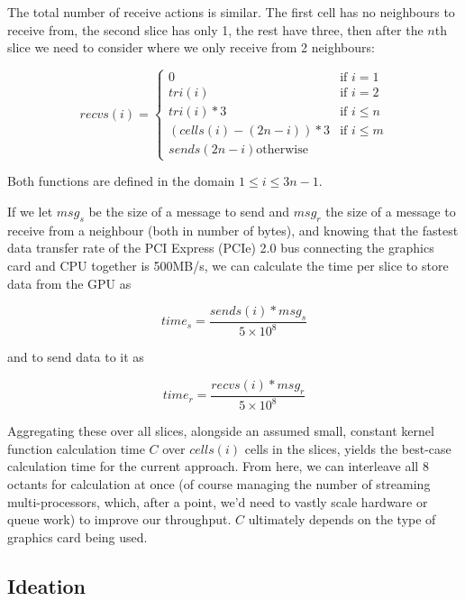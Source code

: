 \documentclass[conference]{IEEEtran}
\begin{document}
The total number of receive actions is similar. The first cell has no neighbours to receive from, the second slice has only 1, the rest have three, then after the $n$th slice we need to consider where we only receive from 2 neighbours:

\begin{equation}
recvs(i) = \left\{
	\begin{array}{ll}
		0 & \mbox{if } i = 1 \\
		tri(i) & \mbox{if } i = 2 \\
		tri(i) * 3 & \mbox{if } i \le n \\
		(cells(i) - (2n - i)) * 3 & \mbox{if } i \le m \\
		sends(2n - i) \mbox{otherwise}
	\end{array}
\right.
\end{equation}

Both functions are defined in the domain $ 1 \le i \le 3n - 1 $.

If we let $ msg_s $ be the size of a message to send and $ msg_r $ the size of a message to receive from a neighbour (both in number of bytes), and knowing that the fastest data transfer rate of the PCI Express (PCIe) 2.0 bus connecting the graphics card and CPU together is 500MB/s\cite{PCIe}, we can calculate the time per slice to store data from the GPU as

\begin{equation}
time_s = \frac{sends(i) * msg_s}{5 \times 10^8}
\end{equation}

and to send data to it as

\begin{equation}
time_r = \frac{recvs(i) * msg_r}{5 \times 10^8}
\end{equation}

Aggregating these over all slices, alongside an assumed small, constant kernel function calculation time $ C $ over $ cells(i) $ cells in the slices, yields the best-case calculation time for the current approach. From here, we can interleave all 8 octants for calculation at once (of course managing the number of streaming multi-processors, which, after a point, we'd need to vastly scale hardware or queue work) to improve our throughput. $C$ ultimately depends on the type of graphics card being used.

\subsection{Ideation}
\label{sec:ideation}
\end{document}
